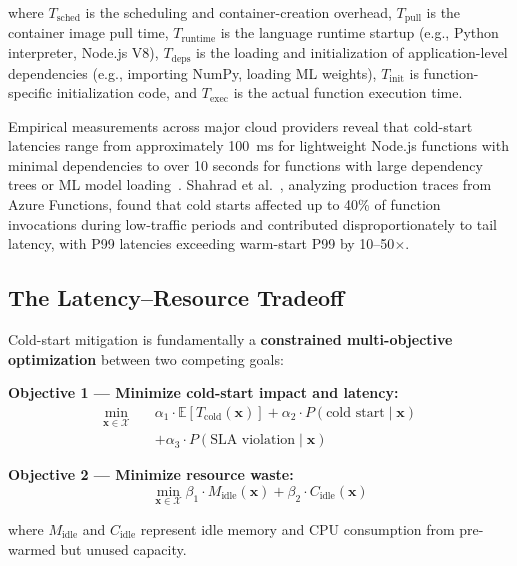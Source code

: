 \documentclass[final,5p,times,twocolumn]{elsarticle}
\begin{document}
where $T_{\text{sched}}$ is the scheduling and container-creation overhead, $T_{\text{pull}}$ is the container image pull time, $T_{\text{runtime}}$ is the language runtime startup (e.g., Python interpreter, Node.js V8), $T_{\text{deps}}$ is the loading and initialization of application-level dependencies (e.g., importing NumPy, loading ML weights), $T_{\text{init}}$ is function-specific initialization code, and $T_{\text{exec}}$ is the actual function execution time.

Empirical measurements across major cloud providers reveal that cold-start latencies range from approximately 100~ms for lightweight Node.js functions with minimal dependencies to over 10 seconds for functions with large dependency trees or ML model loading~\cite{mohan2019agile, wang2018peeking, bermbach2020using}. Shahrad et al.~\cite{shahrad2020serverless}, analyzing production traces from Azure Functions, found that cold starts affected up to 40\% of function invocations during low-traffic periods and contributed disproportionately to tail latency, with P99 latencies exceeding warm-start P99 by 10--50$\times$.

\subsection{The Latency--Resource Tradeoff}

Cold-start mitigation is fundamentally a \textbf{constrained multi-objective optimization} between two competing goals:

\textbf{Objective 1 --- Minimize cold-start impact and latency:}
\begin{equation}
\begin{split}
\min_{\mathbf{x} \in \mathcal{X}} \quad & \alpha_1 \cdot \mathbb{E}[T_{\text{cold}}(\mathbf{x})] + \alpha_2 \cdot P(\text{cold start} \mid \mathbf{x}) \\
& + \alpha_3 \cdot P(\text{SLA violation} \mid \mathbf{x})
\end{split}
\end{equation}

\textbf{Objective 2 --- Minimize resource waste:}
\begin{equation}
\min_{\mathbf{x} \in \mathcal{X}} \beta_1 \cdot M_{\text{idle}}(\mathbf{x}) + \beta_2 \cdot C_{\text{idle}}(\mathbf{x})
\end{equation}

where $M_{\text{idle}}$ and $C_{\text{idle}}$ represent idle memory and CPU consumption from pre-warmed but unused capacity.
\end{document}
